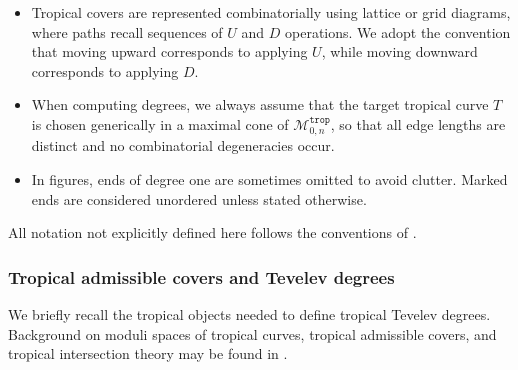 \documentclass[11pt,reqno]{amsart}
\theoremstyle{definition}
\newcommand\trop{{\mathtt{trop}}}
\newcommand\Mgn[1]{\mathcal M_{#1}}
\begin{document}
\begin{itemize}
    \item Tropical covers are represented combinatorially using lattice or grid
    diagrams, where paths recall sequences of $U$ and $D$ operations. We adopt the convention
    that moving upward corresponds to applying $U$, while moving downward corresponds to
    applying $D$.

    \item When computing degrees, we always assume that the target tropical curve $T$ is
    chosen generically in a maximal cone of $\Mgn{0,n}^{\trop}$, so that all edge lengths
    are distinct and no combinatorial degeneracies occur.

    \item In figures, ends of degree one are sometimes omitted to avoid clutter. Marked ends
    are considered unordered unless stated otherwise.
\end{itemize}

All notation not explicitly defined here follows the conventions of \cite{troptev}.

\subsubsection{Tropical admissible covers and Tevelev degrees}
We briefly recall the tropical objects needed to define tropical Tevelev degrees.
Background on moduli spaces of tropical curves, tropical admissible covers,
and tropical intersection theory may be found in
\cite{MikhalkinModuli,m:survey,Caporaso,CMRadmissible,macstu:tropgeom}.
\end{document}
